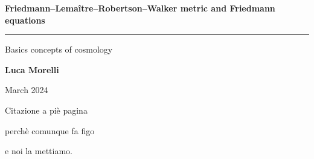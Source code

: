 \begin{titlepage}
	\vspace*{5cm}
	\begin{center}
	\huge \textbf{Friedmann–Lemaître–Robertson–Walker metric and Friedmann equations}
	
	\rule{7cm}{0.4pt} 
	
	\LARGE Basics concepts of cosmology
	
	\vspace{40pt}
	
	\LARGE \textbf{Luca Morelli}
	
	\vspace{20pt}
	
	\LARGE March 2024
	
	\end{center}
   
   \vspace{200pt}
   
    \begin{flushright}
    	Citazione a piè pagina
    	
    	perchè comunque fa figo
    	
    	e noi la mettiamo.
    \end{flushright}	
\end{titlepage}